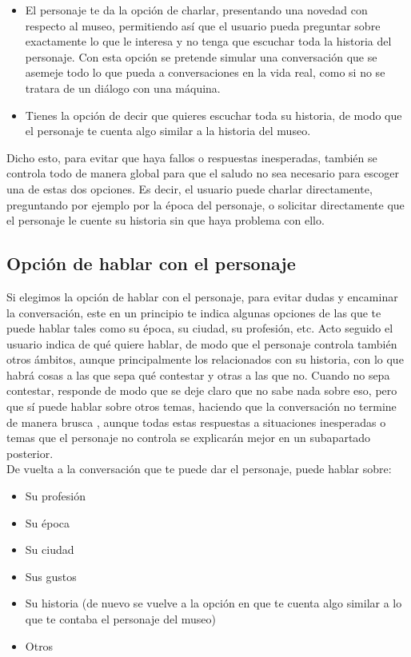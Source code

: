 \documentclass{article}
\begin{document}
\begin{itemize}
	\item El personaje te da la opción de charlar, presentando una novedad con respecto al museo, permitiendo así que el usuario pueda preguntar sobre exactamente lo que le interesa y no tenga que escuchar toda la historia del personaje. Con esta opción se pretende simular una conversación que se asemeje todo lo que pueda a conversaciones en la vida real, como si no se tratara de un diálogo con una máquina. 
	
	\item Tienes la opción de decir que quieres escuchar toda su historia, de modo que el personaje te cuenta algo similar a la historia del museo. 
\end{itemize}

Dicho esto, para evitar que haya fallos o respuestas inesperadas, también se controla todo de manera global para que el saludo no sea necesario para escoger una de estas dos opciones. Es decir, el usuario puede charlar directamente, preguntando por ejemplo por la época del personaje, o solicitar directamente que el personaje le cuente su historia sin que haya problema con ello. 


\subsection*{Opción de hablar con el personaje}

Si elegimos la opción de hablar con el personaje, para evitar dudas y encaminar la conversación, este en un principio te indica algunas opciones de las que te puede hablar tales como su época, su ciudad, su profesión, etc. Acto seguido el usuario indica de qué quiere hablar, de modo que el personaje controla también otros ámbitos, aunque principalmente los relacionados con su historia, con lo que habrá cosas a las que sepa qué contestar y otras a las que no. Cuando no sepa contestar, responde de modo que se deje claro que no sabe nada sobre eso, pero que sí puede hablar sobre otros temas, haciendo que la conversación no termine de manera brusca , aunque todas estas respuestas a situaciones inesperadas o temas que el personaje no controla se explicarán mejor en un subapartado posterior. \\

De vuelta a la conversación que te puede dar el personaje, puede hablar sobre: 

\begin{itemize}
	\item Su profesión
	
	\item Su época
	
	\item Su ciudad
	
	\item Sus gustos
	
	\item Su historia (de nuevo se vuelve a la opción en que te cuenta algo similar a lo que te contaba el personaje del museo)
	
	\item Otros
	
\end{itemize}
\end{document}
